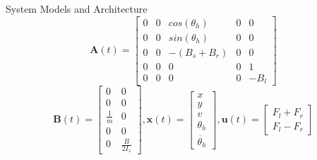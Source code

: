 \begin{section}{System Models and Architecture}
    \begin{equation}
	\bm{A}(t)=\begin{bmatrix} 0 & 0 & cos(\theta_h) & 0 & 0\\ 0 & 0 & sin(\theta_h) & 0 & 0 \\ 0 & 0 & -(B_s+B_r) & 0 & 0 \\ 0 & 0 & 0 & 0 & 1 \\ 0 & 0 & 0 & 0 & -B_l \end{bmatrix} \nonumber
	\end{equation}
	\begin{equation}
	\bm{B}(t)=\begin{bmatrix} 0 & 0 \\ 0 & 0 \\ \frac{1}{m} & 0 \\ 0 & 0 \\ 0 & \frac{B}{2I_z} \end{bmatrix}, 
     \bm{x}(t)=\begin{bmatrix} x \\ y \\ v \\ \theta_h \\ \dot{\theta_h} \end{bmatrix}, \bm{u}(t)= \begin{bmatrix} F_l+F_r \\ F_l-F_r  \end{bmatrix}  \nonumber
	\end{equation}




\end{section}
